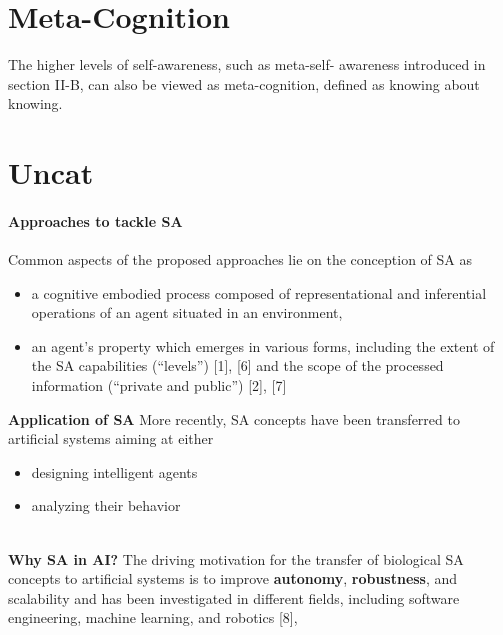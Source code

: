 \documentclass{article}
\begin{document}
		\section{Meta-Cognition}
			The higher levels of self-awareness, such as meta-self-
			awareness introduced in section \citet{lewis-2011-a-survey-of-self-awareness-and-its-application-in-computing-systems}II-B, can also be viewed as
			meta-cognition, defined \citet{overschelde-2008-metacognition-knowing-about-knowing} as knowing about knowing.
		\section{Uncat}
		\paragraph{Approaches to tackle SA} Common aspects of the proposed approaches lie on the conception of SA as 
		\begin{itemize}
			\item a cognitive embodied process composed of representational and inferential operations of an agent situated in an environment,
			\item an agent’s property which emerges in various forms, including the extent of the SA capabilities (“levels”) \citet{regazzoni-2020-multi-sensorial-generative-and-descriptive-self-awareness-models-for-autonomous-systems}[1], \citet{regazzoni-2020-multi-sensorial-generative-and-descriptive-self-awareness-models-for-autonomous-systems}[6] and the scope of the processed information (“private and public”) \citet{regazzoni-2020-multi-sensorial-generative-and-descriptive-self-awareness-models-for-autonomous-systems}[2], \citet{regazzoni-2020-multi-sensorial-generative-and-descriptive-self-awareness-models-for-autonomous-systems}[7]
		\end{itemize}
		\textbf{Application of SA} More recently, SA concepts have been transferred to artificial systems aiming at either 
		\begin{itemize}
			\item designing intelligent agents
			\item analyzing their behavior
		\end{itemize}
		\\
		\textbf{Why SA in AI?} The driving motivation for the transfer of biological SA concepts
		to artificial systems is to improve \textbf{autonomy}, \textbf{robustness}, and scalability and has been investigated in different fields, including software engineering, machine learning, and robotics \citet{regazzoni-2020-multi-sensorial-generative-and-descriptive-self-awareness-models-for-autonomous-systems}[8],
\end{document}
